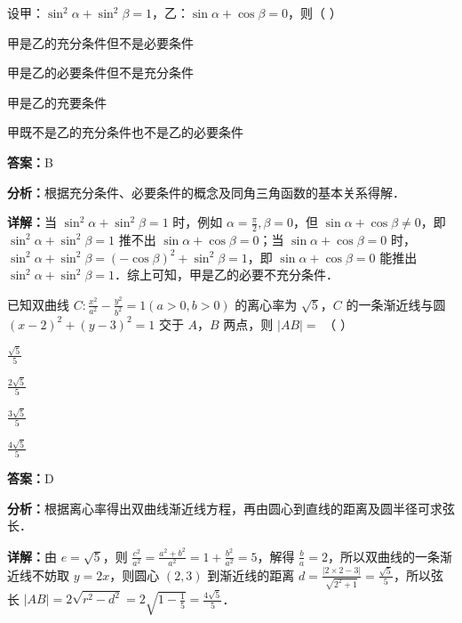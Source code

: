 \begin{question}[points=5]
设甲：$\sin^2 \alpha + \sin^2 \beta = 1$，乙：$\sin \alpha + \cos \beta = 0$，则（           ）
\begin{choices}
  \item 甲是乙的充分条件但不是必要条件
  \item 甲是乙的必要条件但不是充分条件
  \item 甲是乙的充要条件
  \item 甲既不是乙的充分条件也不是乙的必要条件
\end{choices}
\begin{solution}
\textbf{答案：}B

\textbf{分析：}根据充分条件、必要条件的概念及同角三角函数的基本关系得解．

\textbf{详解：}当 $\sin^2 \alpha + \sin^2 \beta = 1$ 时，例如 $\alpha = \frac{\pi}{2}, \beta = 0$，但 $\sin \alpha + \cos \beta \neq 0$，即 $\sin^2 \alpha + \sin^2 \beta = 1$ 推不出 $\sin \alpha + \cos \beta = 0$；当 $\sin \alpha + \cos \beta = 0$ 时，$\sin^2 \alpha + \sin^2 \beta = (-\cos \beta)^2 + \sin^2 \beta = 1$，即 $\sin \alpha + \cos \beta = 0$ 能推出 $\sin^2 \alpha + \sin^2 \beta = 1$．综上可知，甲是乙的必要不充分条件．
\end{solution}
\end{question}

\begin{question}[points=5]
已知双曲线 $C: \frac{x^2}{a^2} - \frac{y^2}{b^2} = 1 (a > 0, b > 0)$ 的离心率为 $\sqrt{5}$，$C$ 的一条渐近线与圆 $(x-2)^2 + (y-3)^2 = 1$ 交于 $A$，$B$ 两点，则 $|AB| = $ （                 ）
\begin{choices}
  \item $\frac{\sqrt{5}}{5}$
  \item $\frac{2\sqrt{5}}{5}$
  \item $\frac{3\sqrt{5}}{5}$
  \item $\frac{4\sqrt{5}}{5}$
\end{choices}
\begin{solution}
\textbf{答案：}D

\textbf{分析：}根据离心率得出双曲线渐近线方程，再由圆心到直线的距离及圆半径可求弦长．

\textbf{详解：}由 $e = \sqrt{5}$，则 $\frac{c^2}{a^2} = \frac{a^2+b^2}{a^2} = 1 + \frac{b^2}{a^2} = 5$，解得 $\frac{b}{a} = 2$，所以双曲线的一条渐近线不妨取 $y = 2x$，则圆心 $(2,3)$ 到渐近线的距离 $d = \frac{|2\times 2 - 3|}{\sqrt{2^2+1}} = \frac{\sqrt{5}}{5}$，所以弦长 $|AB| = 2\sqrt{r^2 - d^2} = 2\sqrt{1 - \frac{1}{5}} = \frac{4\sqrt{5}}{5}$．
\end{solution}
\end{question}

